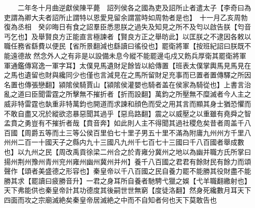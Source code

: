 　　二年冬十月曲逆獻侯陳平薨　詔列侯各之國為吏及詔所止者遣太子【李奇曰為吏謂為卿大夫者詔所止謂特以恩愛見留余謂當時如周勃者是也】　十一月乙亥周勃復為丞相　癸卯晦日有食之詔羣臣悉思朕之過失及知見之所不及匄以啟告朕【匄音丐乞也】及舉賢良方正能直言極諫者【賢良方正之舉昉此】以匡朕之不逮因各敕以職任務省繇費以便民【省所景翻減也繇讀曰徭役也】罷衛將軍【按班紀詔曰朕既不能遠德故然念外人之有非是以設備未息今縱不能罷邊屯戍又飭兵厚衛其罷衛將軍軍通鑑傳寫逸一軍字耳】太僕見馬遺財足餘皆以給傳置【班表太僕掌輿馬見馬見在之馬也遺留也財與纔同少也僅也言減見在之馬所留財足充事而已置者置傳驛之所因名置也傳張戀翻】潁隂侯騎賈山【潁隂侯灌嬰也騎者盖在侯家為騎從也】上書言治亂之道曰臣聞雷霆之所擊無不摧折者【折而設翻】萬鈞之所壓無不糜滅者今人主之威非特雷霆也埶重非特萬鈞也開道而求諫和顔色而受之用其言而顯其身士猶恐懼而不敢自盡又况於縱欲恣暴惡聞其過乎【惡烏路翻】震之以威壓之以重雖有堯舜之智孟賁之勇豈有不摧折者哉【賁音奔】如此則人主不得聞其過社稷危矣昔者周盖千八百國【周爵五等而土三等公侯百里伯七十里子男五十里不滿為附庸九州州方千里八州州二百一十國天子之縣内九十三國凡九州千七百七十三國曰千八百國者舉成數也】以九州之民【周改禹貢徐梁二州合之於青雍分冀州之地以為幽并職方氏所掌曰揚州荆州豫州青州兖州雍州幽州冀州并州】養千八百國之君君有餘財民有餘力而頌聲作【頌者美盛德之形容也】秦皇帝以千八百國之民自養力罷不能勝其役財盡不能勝其求【罷讀曰疲勝音升】一君之身耳所自養者馳騁弋獵之娛【弋羊職翻繳射也】天下弗能供也秦皇帝計其功德度其後嗣世世無窮【度徒洛翻】然身死纔數月耳天下四面而攻之宗廟滅絶矣秦皇帝居滅絶之中而不自知者何也天下莫敢告也